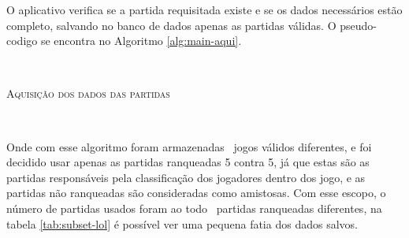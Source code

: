 O aplicativo verifica se a partida requisitada existe e se os dados necessários estão completo, salvando no banco de dados apenas as partidas válidas. O pseudo-codigo se encontra no Algoritmo \ref{alg:main-aqui}.

\


\begin{algorithm}[H]
   \SetAlgoLined
   \label{alg:main-aqui}
   \caption{\textsc{Aquisição dos dados das partidas}}
 \end{algorithm}

\

Onde com esse algoritmo foram armazenadas \numpartidas\ jogos válidos diferentes, e foi decidido usar apenas as partidas ranqueadas 5 contra 5, já que estas são as partidas responsáveis pela classificação dos jogadores dentro dos jogo, e as partidas não ranqueadas são consideradas como amistosas.
Com esse escopo, o número de partidas usados foram ao todo \partidasrankeds\ partidas ranqueadas diferentes, na tabela \ref{tab:subset-lol} é possível ver uma pequena fatia dos dados salvos.


